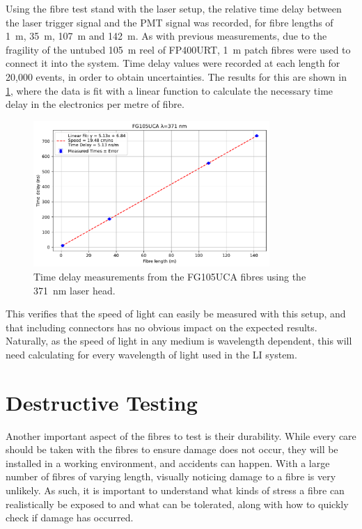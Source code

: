 \documentclass[a4paper,11pt]{article}
\begin{document}
Using the fibre test stand with the laser setup, the relative time delay between the laser trigger signal and the PMT signal was recorded, for fibre lengths of 1~m, 35~m, 107~m and 142~m. As with previous measurements, due to the fragility of the untubed 105~m reel of FP400URT, 1~m patch fibres were used to connect it into the system. Time delay values were recorded at each length for 20,000 events, in order to obtain uncertainties. The results for this are shown in \cref{fig:FP400URTc}, where the data is fit with a linear function to calculate the necessary time delay in the electronics per metre of fibre.
\begin{figure}[h]
\centering
\includegraphics[width=0.8\textwidth]{FG105UCATiming_371nm.pdf}
\caption{Time delay measurements from the FG105UCA fibres using the 371~nm laser head.}\label{fig:FP400URTc}
\end{figure}
This verifies that the speed of light can easily be measured with this setup, and that including connectors has no obvious impact on the expected results. Naturally, as the speed of light in any medium is wavelength dependent, this will need calculating for every wavelength of light used in the LI system.

\section{Destructive Testing}\label{sec:destruction}
Another important aspect of the fibres to test is their durability. While every care should be taken with the fibres to ensure damage does not occur, they will be installed in a working environment, and accidents can happen.  With a large number of fibres of varying length, visually noticing damage to a fibre is very unlikely. As such, it is important to understand what kinds of stress a fibre can realistically be exposed to and what can be tolerated, along with how to quickly check if damage has occurred.
\end{document}
